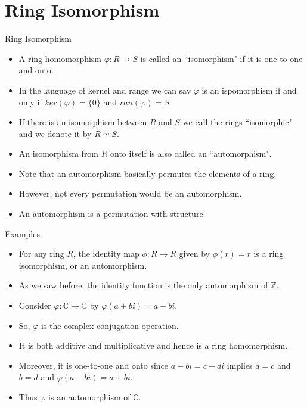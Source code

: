 \documentclass[ %
 10pt, xcolor={dvipsnames,svgnames,x11names,hyperref},
   hyperref={colorlinks=true,citecolor=green,linkcolor=DarkRed,urlcolor=ProcessBlue,anchorcolor=blue}
  ]{beamer}
\newenvironment{stepitemize}{\begin{itemize}[<+->]}{\end{itemize} }
\newcommand{\Z}{\mathbb{Z}}
\newcommand{\C}{\mathbb{C}}
\begin{document}
\section{Ring Isomorphism}
\begin{frame}{Ring Isomorphism}
    \begin{stepitemize}
    \item A ring homomorphism $\varphi:R\rightarrow S$ is called an ``isomorphism" if it is one-to-one and onto.
    \item In the language of kernel and range we can say $\varphi$ is an ispomorphism if and only if $ker(\varphi)=\{0\}$ and $ran(\varphi)=S$
    \item If there is an isomorphism between $R$ and $S$ we call the rings ``isomorphic" and we denote it by $R\simeq S$.
    \item An isomorphism from $R$ onto itself is also called an ``automorphism".
    \item Note that an automorphism basically permutes the elements of a ring.
    \item However, not every permutation would be an automorphism.
    \item An automorphism is a permutation with structure.
    \end{stepitemize}
\end{frame}

\begin{frame}{Examples}
\begin{stepitemize}
 \item For any ring $R$, the identity map $\phi:R\rightarrow R$ given by $\phi(r)=r$ is a ring isomorphism, or an automorphism.
    \item As we saw before, the identity function is the only automorphism of $\Z$.
    \item Consider $\varphi:\C \rightarrow \C$ by $\varphi(a+bi)=a-bi$,
    \item So, $\varphi$ is the complex conjugation operation.
    \item It is both additive and multiplicative and hence is a ring homomorphism.
    \item Moreover, it is one-to-one and onto since $a-bi=c-di$ implies $a=c$ and $b=d$ and $\varphi(a-bi)=a+bi$.
    \item Thus $\varphi$ is an automorphism of $\C$.
\end{stepitemize}
\end{frame}
\end{document}
